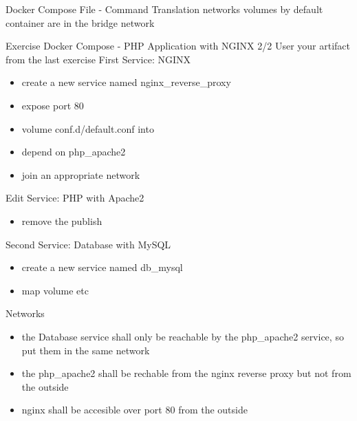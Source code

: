 \documentclass[10pt,aspectratio=\ratio,
compress
]{beamer}
\begin{document}
\begin{frame}{Docker Compose File - Command Translation}
networks
volumes
by default container are in the bridge network
\end{frame}

\begin{frame}{Exercise Docker Compose - PHP Application with NGINX 2/2}
User your artifact from the last exercise
First Service: NGINX
\begin{itemize}
	\item create a new service named nginx\_reverse\_proxy
	\item expose port 80
	\item volume conf.d/default.conf into
	\item depend on php\_apache2
	\item join an appropriate network
\end{itemize}
Edit Service: PHP with Apache2
\begin{itemize}
	\item remove the publish
\end{itemize}
Second Service: Database with MySQL
\begin{itemize}
	\item create a new service named db\_mysql
	\item map volume etc
\end{itemize}
Networks
\begin{itemize}
	\item the Database service shall only be reachable by the php\_apache2 service, so put them in the same network
	\item the php\_apache2 shall be rechable from the nginx reverse proxy but not from the outside
	\item nginx shall be accesible over port 80 from the outside
\end{itemize}
\end{frame}
\end{document}
